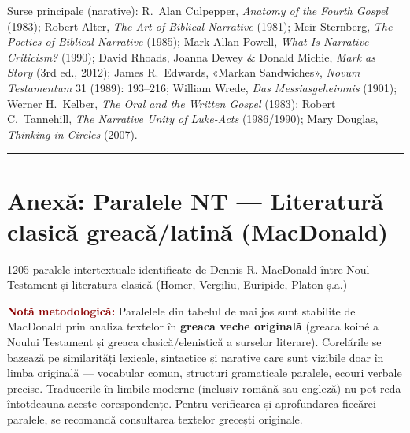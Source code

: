 \documentclass[12pt,a4paper,twoside,openany]{book}
\begin{document}
\vspace{10pt}
\noindent\small Surse principale (narative): R.\ Alan Culpepper, \textit{Anatomy of the Fourth Gospel} (1983); Robert Alter, \textit{The Art of Biblical Narrative} (1981); Meir Sternberg, \textit{The Poetics of Biblical Narrative} (1985); Mark Allan Powell, \textit{What Is Narrative Criticism?} (1990); David Rhoads, Joanna Dewey \& Donald Michie, \textit{Mark as Story} (3rd ed., 2012); James R.\ Edwards, «Markan Sandwiches», \textit{Novum Testamentum} 31 (1989): 193--216; William Wrede, \textit{Das Messiasgeheimnis} (1901); Werner H.\ Kelber, \textit{The Oral and the Written Gospel} (1983); Robert C.\ Tannehill, \textit{The Narrative Unity of Luke-Acts} (1986/1990); Mary Douglas, \textit{Thinking in Circles} (2007).
\normalsize

\bigskip\noindent\textcolor{darkred}{\rule{\textwidth}{2pt}}\bigskip

\chapter{Anexă: Paralele NT --- Literatură clasică greacă/latină (MacDonald)}\label{macdonald}
1205 paralele intertextuale identificate de Dennis R. MacDonald între Noul Testament și literatura clasică (Homer, Vergiliu, Euripide, Platon ș.a.)

\begin{contextbox}

\textcolor{darkred}{\textbf{Notă metodologică:}} Paralelele din tabelul de mai jos sunt stabilite de MacDonald prin analiza textelor în \textbf{greaca veche originală} (greaca koiné a Noului Testament și greaca clasică/elenistică a surselor literare). Corelările se bazează pe similarități lexicale, sintactice și narative care sunt vizibile doar în limba originală — vocabular comun, structuri gramaticale paralele, ecouri verbale precise. Traducerile în limbile moderne (inclusiv română sau engleză) nu pot reda întotdeauna aceste corespondențe. Pentru verificarea și aprofundarea fiecărei paralele, se recomandă consultarea textelor grecești originale.

\end{contextbox}
\end{document}

